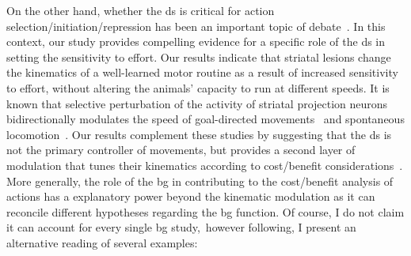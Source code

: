 On the other hand, whether the \gls{ds} is critical for action selection/initiation/repression has been an important topic of debate~\cite{Turner2010CurrOpinNeurobiol, Dudman2016CurrOpinNeurobiol}.
In this context, our study provides compelling evidence for a specific role of the \gls{ds} in setting the sensitivity to effort.
Our results indicate that striatal lesions change the kinematics of a well-learned motor routine as a result of increased sensitivity to effort, without altering the animals' capacity to run at different speeds.
It is known that selective perturbation of the activity of striatal projection neurons bidirectionally modulates the speed of goal-directed movements~\cite{Yttri2016Nature} and spontaneous locomotion~\cite{Kravitz2010Nature}.
Our results complement these studies by suggesting that the \gls{ds} is not the primary controller of movements, but provides a second layer of modulation that tunes their kinematics according to cost/benefit considerations~\cite{Berke2018NN,Beeler2012Fron}.
More generally, the role of the \gls{bg} in contributing to the cost/benefit analysis of actions has a explanatory power beyond the kinematic modulation as it can reconcile different hypotheses regarding the \gls{bg} function.
Of course, I do not claim it can account for every single \gls{bg} study,\footnotemark\ however following, I present an alternative reading of several examples:
